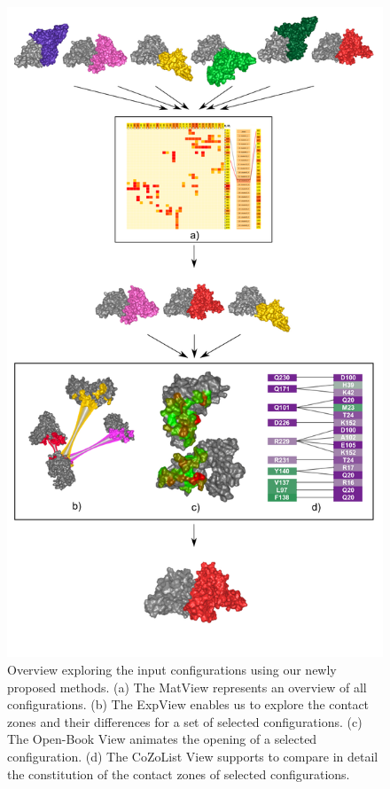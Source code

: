 \documentclass{bmcart}
\begin{document}
\begin{backmatter}
\begin{figure}[h!]
  \centering	
  \includegraphics[width=\columnwidth]{images/figure3.pdf}
  \caption{
  Overview exploring the input configurations using our newly proposed methods. (a) The MatView represents an overview of all configurations. (b) The ExpView enables us to explore the contact zones and their differences for a set of selected configurations. (c) The Open-Book View animates the opening of a selected configuration. (d) The CoZoList View supports to compare in detail the constitution of the contact zones of selected configurations.}
  \label{fig:workflow}
\end{figure}


\end{backmatter}
\end{document}

